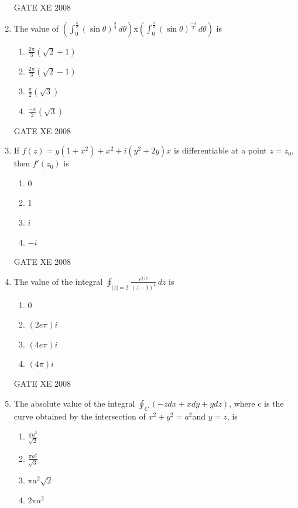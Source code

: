 \documentclass[12pt]{article}
\begin{document}
\begin{enumerate}[label=Q\arabic*.]
GATE XE 2008
\item The value of \newline$(\int_{0}^{\frac{\pi}{2}} (\sin\theta)^\frac{3}{4} \, d\theta)$x$(\int_{0}^{\frac{\pi}{2}} (\sin\theta)^\frac{-3}{4} \, d\theta)$ is

\begin{enumerate}[label=(\Alph*)]
\item $\frac{2\pi}{3} (\sqrt{2} +1)$
\item $\frac{2\pi}{3} (\sqrt{2} -1)$
\item $\frac{\pi}{2} (\sqrt{3})$
\item $\frac{-\pi}{2} (\sqrt{3})$
\end{enumerate}

GATE XE 2008
\item If $f(z)=y(1+x^2) +x^2 +i(y^2+2y)x$ is differentiable at a point $z=z_0$, then $f'(z_0)$ is

\begin{enumerate}[label=(\Alph*)]
\item 0
\item 1
\item $i$
\item $-i$
\end{enumerate}

GATE XE 2008

\item  The value of the integral $\oint_{|z|=2} \frac{e^{1/z}}{(z-1)^2} \,dz$ is

\begin{enumerate}[label=(\Alph*)]
\item 0
\item $(2e\pi)i$
 \item $(4e\pi)i$
\item $(4\pi)i$
\end{enumerate}

GATE XE 2008
\item  The absolute value of the integral $\oint_C(-zdx+xdy+ydz)$, where c is the curve obtained by the intersection of $x^2 + y^2 = a^2$and $y=z$, is

\begin{enumerate}[label=(\Alph*)]
\item  $\frac{\pi a^2}{\sqrt{2}}$
\item $\frac{\pi a^2}{\sqrt{3}}$
\item $\pi a^2 \sqrt{2}$
\item $2\pi a^2$
\end{enumerate}


\end{enumerate}
\end{document}
